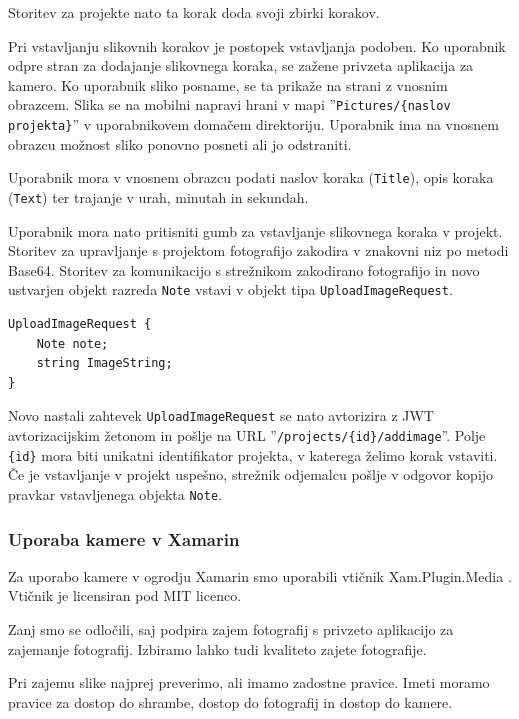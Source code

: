 \documentclass[a4paper, 12pt]{book}
\begin{document}
Storitev za projekte nato ta korak doda svoji zbirki korakov.

Pri vstavljanju slikovnih korakov je postopek vstavljanja podoben.
Ko uporabnik odpre stran za dodajanje slikovnega koraka, se zažene privzeta aplikacija za kamero.
Ko uporabnik sliko posname, se ta prikaže na strani z vnosnim obrazcem.
Slika se na mobilni napravi hrani v mapi ''\texttt{Pictures/\{naslov projekta\}}'' v uporabnikovem domačem direktoriju.
Uporabnik ima na vnosnem obrazcu možnost sliko ponovno posneti ali jo odstraniti.

Uporabnik mora v vnosnem obrazcu podati naslov koraka (\texttt{Title}), opis koraka (\texttt{Text}) ter trajanje v urah, minutah in sekundah.

Uporabnik mora nato pritisniti gumb za vstavljanje slikovnega koraka v projekt.
Storitev za upravljanje s projektom fotografijo zakodira v znakovni niz po metodi Base64.
Storitev za komunikacijo s strežnikom zakodirano fotografijo in novo ustvarjen objekt razreda \texttt{Note} vstavi v objekt tipa \texttt{UploadImageRequest}.

\begin{Verbatim}[commandchars=+\[\]]
UploadImageRequest {
    Note note;
    string ImageString; 
}
\end{Verbatim}

Novo nastali zahtevek \texttt{UploadImageRequest} se nato avtorizira z JWT avtorizacijskim žetonom in pošlje na URL ''\texttt{/projects/\{id\}/addimage}''.
Polje \texttt{\{id\}} mora biti unikatni identifikator projekta, v katerega želimo korak vstaviti.
Če je vstavljanje v projekt uspešno, strežnik odjemalcu pošlje v odgovor kopijo pravkar vstavljenega objekta \texttt{Note}.


\subsubsection{Uporaba kamere v Xamarin}


Za uporabo kamere v ogrodju Xamarin smo uporabili vtičnik Xam.Plugin.Media \cite{xampluginmedia}.
Vtičnik je licensiran pod MIT licenco.

Zanj smo se odločili, saj podpira zajem fotografij s privzeto aplikacijo za zajemanje fotografij.
Izbiramo lahko tudi kvaliteto zajete fotografije.

Pri zajemu slike najprej preverimo, ali imamo zadostne pravice.
Imeti moramo pravice za dostop do shrambe, dostop do fotografij in dostop do kamere.
\end{document}

